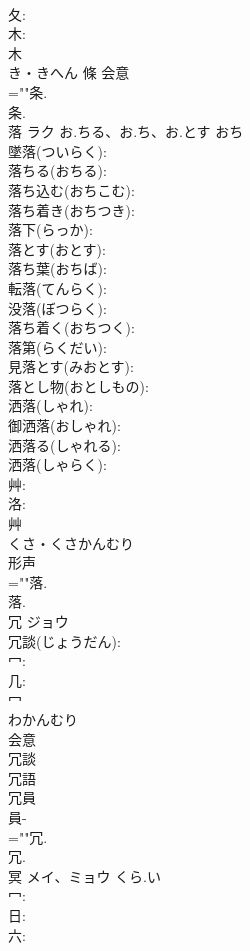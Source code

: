 \documentclass[8pt]{extreport}
\begin{document}
\begin{CJK}{UTF8}{min}
\\	夂: 
\\	木: 
\\	木	
\\	き・きへん	條	会意 
\\	=""条.
\\	条.
\\	落	ラク	お.ちる、お.ち、お.とす	おち	
\\	墜落(ついらく): 
\\	落ちる(おちる): 
\\	落ち込む(おちこむ): 
\\	落ち着き(おちつき): 
\\	落下(らっか): 
\\	落とす(おとす): 
\\	落ち葉(おちば): 
\\	転落(てんらく): 
\\	没落(ぼつらく): 
\\	落ち着く(おちつく): 
\\	落第(らくだい): 
\\	見落とす(みおとす): 
\\	落とし物(おとしもの): 
\\	洒落(しゃれ): 
\\	御洒落(おしゃれ): 
\\	洒落る(しゃれる): 
\\	洒落(しゃらく): 
\\	艸: 
\\	洛: 
\\	艸	
\\	くさ・くさかんむり	
\\	形声 
\\	=""落.
\\	落.
\\	冗	ジョウ			
\\	冗談(じょうだん): 
\\	冖: 
\\	几: 
\\	冖	
\\	わかんむり	
\\	会意 
\\	冗談 
\\	冗語 
\\	冗員 
\\	員-
\\	=""冗.
\\	冗.
\\	冥	メイ、ミョウ	くら.い		
\\	冖: 
\\	日: 
\\	六: 

\end{CJK}
\end{document}
